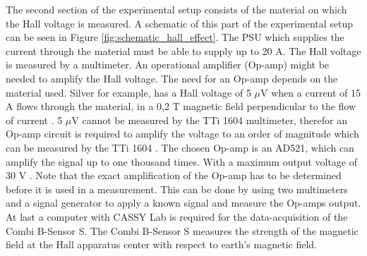 The second section of the experimental setup consists of the material on which the Hall voltage is measured. A schematic of this part of the experimental setup can be seen in Figure \ref{fig:schematic_hall_effect}. The PSU which supplies the current through the material must be able to supply up to 20 A. The Hall voltage is measured by a multimeter. An operational amplifier (Op-amp) might be needed to amplify the Hall voltage. The need for an Op-amp depends on the material used. Silver for example, has a Hall voltage of 5 $\mu$V when a current of 15 A flows through the material, in a 0,2 T magnetic field perpendicular to the flow of current \cite{halleffectzilver}. 5 $\mu$V cannot be measured by the TTi 1604 multimeter, therefor an Op-amp circuit is required to amplify the voltage to an order of magnitude which can be measured by the TTi 1604 \cite{dmm}. The chosen Op-amp is an AD521, which can amplify the signal up to one thousand times. With a maximum output voltage of 30 V \cite{AD521}. Note that the exact amplification of the Op-amp has to be determined before it is used in a measurement. This can be done by using two multimeters and a signal generator to apply a known signal and measure the Op-amps output. At last a computer with CASSY Lab is required for the data-acquisition of the Combi B-Sensor S. The Combi B-Sensor S measures the strength of the magnetic field at the Hall apparatus center with respect to earth's magnetic field.
    
